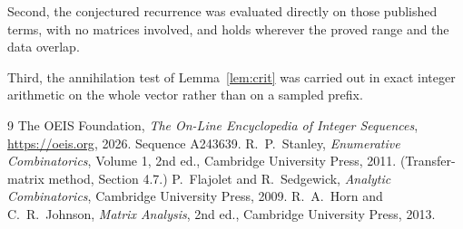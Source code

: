 \documentclass[11pt,a4paper]{article}
\theoremstyle{plain}
\theoremstyle{definition}
\begin{document}
Second, the conjectured recurrence was evaluated directly on those published terms, with no
matrices involved, and holds wherever the proved range and the data overlap.

Third, the annihilation test of Lemma~\ref{lem:crit} was carried out in exact integer
arithmetic on the whole vector rather than on a sampled prefix.

\begin{thebibliography}{9}
 The OEIS Foundation, \emph{The On-Line Encyclopedia of Integer
Sequences}, \url{https://oeis.org}, 2026. Sequence A243639.
 R.~P.~Stanley, \emph{Enumerative Combinatorics}, Volume 1, 2nd ed.,
Cambridge University Press, 2011. (Transfer-matrix method, Section 4.7.)
 P.~Flajolet and R.~Sedgewick, \emph{Analytic Combinatorics}, Cambridge
University Press, 2009.
 R.~A.~Horn and C.~R.~Johnson, \emph{Matrix Analysis}, 2nd ed., Cambridge
University Press, 2013.
\end{thebibliography}
\end{document}
